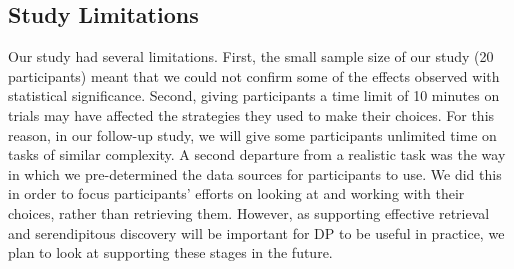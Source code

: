 \documentclass{sigchi}
\begin{document}
\subsection{Study Limitations}

Our study had several limitations.  First, the small sample size of our study (20 participants) meant that we could not confirm some of the effects observed with statistical significance.  Second, giving participants a time limit of 10 minutes on trials may have affected the strategies they used to make their choices.  For this reason, in our follow-up study, we will give some participants unlimited time on tasks of similar complexity.  A second departure from a realistic task was the way in which we pre-determined the data sources for participants to use.  We did this in order to focus participants' efforts on looking at and working with their choices, rather than retrieving them.  However, as supporting effective retrieval and serendipitous discovery will be important for DP to be useful in practice, we plan to look at supporting these stages in the future. 



\end{document}
